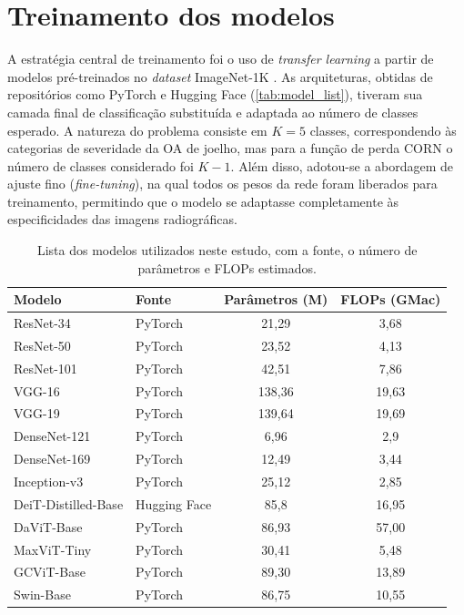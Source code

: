 \section{Treinamento dos modelos}

A estratégia central de treinamento foi o uso de \textit{transfer learning} a partir de modelos pré-treinados no \textit{dataset} ImageNet-1K \citep{Russakovsky2015}. As arquiteturas, obtidas de repositórios como PyTorch e Hugging Face (\autoref{tab:model_list}), tiveram sua camada final de classificação substituída e adaptada ao número de classes esperado. A natureza do problema consiste em $K=5$ classes, correspondendo às categorias de severidade da OA de joelho, mas para a função de perda CORN o número de classes considerado foi $K-1$. Além disso, adotou-se a abordagem de ajuste fino (\textit{fine-tuning}), na qual todos os pesos da rede foram liberados para treinamento, permitindo que o modelo se adaptasse completamente às especificidades das imagens radiográficas.

\begin{table}[ht]
    \centering
    \begin{tabular}{|l|l|c|c|}
        \hline
        \textbf{Modelo} & \textbf{Fonte} & \textbf{Parâmetros (M)} & \textbf{FLOPs (GMac)} \\
        \hline
        ResNet-34 & PyTorch & 21,29 & 3,68 \\
        \hline
        ResNet-50 & PyTorch & 23,52 & 4,13 \\
        \hline
        ResNet-101 & PyTorch & 42,51 & 7,86 \\
        \hline
        VGG-16 & PyTorch & 138,36 & 19,63 \\
        \hline
        VGG-19 & PyTorch & 139,64 & 19,69 \\
        \hline
        DenseNet-121 & PyTorch & 6,96 & 2,9 \\
        \hline
        DenseNet-169 & PyTorch & 12,49 & 3,44 \\
        \hline
        Inception-v3 & PyTorch & 25,12 & 2,85 \\
        \hline
        DeiT-Distilled-Base & Hugging Face & 85,8 & 16,95 \\
        \hline
        DaViT-Base & PyTorch & 86,93 & 57,00 \\
        \hline
        MaxViT-Tiny & PyTorch & 30,41 & 5,48 \\
        \hline
        GCViT-Base & PyTorch & 89,30 & 13,89 \\
        \hline
        Swin-Base & PyTorch & 86,75 & 10,55 \\
        \hline
    \end{tabular}
    \caption{Lista dos modelos utilizados neste estudo, com a fonte, o número de parâmetros e FLOPs estimados.}
    \label{tab:model_list}
\end{table}

